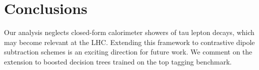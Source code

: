 \section{Conclusions}\label{sec:conclusions}

Our analysis neglects closed-form calorimeter showers of tau lepton
decays, which may become relevant at the LHC. Extending this framework
to contrastive dipole subtraction schemes is an exciting direction for
future work. We comment on the extension to boosted decision trees
trained on the top tagging benchmark.

